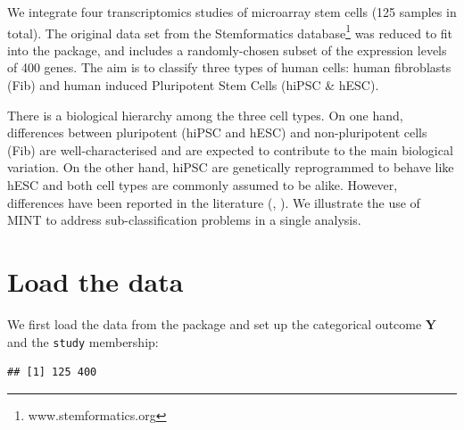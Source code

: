 \documentclass[]{book}
\newenvironment{Shaded}{\begin{snugshade}}{\end{snugshade}}
\newcommand{\CommentTok}[1]{\textcolor[rgb]{0.56,0.35,0.01}{\textit{#1}}}
\newcommand{\KeywordTok}[1]{\textcolor[rgb]{0.13,0.29,0.53}{\textbf{#1}}}
\newcommand{\NormalTok}[1]{#1}
\newcommand{\OperatorTok}[1]{\textcolor[rgb]{0.81,0.36,0.00}{\textbf{#1}}}
\newcommand{\StringTok}[1]{\textcolor[rgb]{0.31,0.60,0.02}{#1}}
\begin{document}
We integrate four transcriptomics studies of microarray stem cells (125 samples in total). The original data set from the Stemformatics database\footnote{www.stemformatics.org} \citep{Well13} was reduced to fit into the package, and includes a randomly-chosen subset of the expression levels of 400 genes. The aim is to classify three types of human cells: human fibroblasts (Fib) and human induced Pluripotent Stem Cells (hiPSC \& hESC).

There is a biological hierarchy among the three cell types. On one hand, differences between pluripotent (hiPSC and hESC) and non-pluripotent cells (Fib) are well-characterised and are expected to contribute to the main biological variation. On the other hand, hiPSC are genetically reprogrammed to behave like hESC and both cell types are commonly assumed to be alike. However, differences have been reported in the literature (\citet{Chi09}, \citet{New10}). We illustrate the use of MINT to address sub-classification problems in a single analysis.

\hypertarget{mint:load}{%
\section{Load the data}\label{mint:load}}

We first load the data from the package and set up the categorical outcome \(\boldsymbol Y\) and the \texttt{study} membership:

\begin{Shaded}
\end{Shaded}

\begin{verbatim}
## [1] 125 400
\end{verbatim}

\begin{Shaded}
\end{Shaded}
\end{document}
